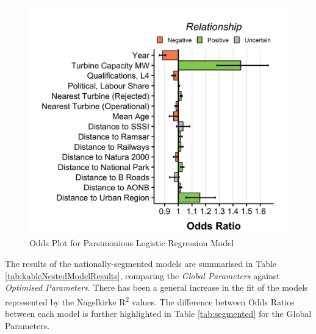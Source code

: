 \documentclass[a4paper,]{article}
\theoremstyle{definition}
\theoremstyle{definition}
\theoremstyle{definition}
\theoremstyle{remark}
\begin{document}
\begin{figure}[h]

{\centering \includegraphics[width=0.5\linewidth]{figures/figure7} 

}

\caption{Odds Plot for Parsimonious Logistic Regression Model}\label{fig:oddsPars}
\end{figure}

The results of the nationally-segmented models are summarised in Table
\ref{tab:kableNestedModelResults}, comparing the \emph{Global
Parameters} against \emph{Optimised Parameters}. There has been a
general increase in the fit of the models represented by the Nagelkirke
R\textsuperscript{2} values. The difference between Odds Ratios between
each model is further highlighted in Table \ref{tab:segmented} for the
Global Parameters.

\begin{table}[!h]

\caption{\label{tab:kableNestedModelResults}Comparison of subset Logistic Regression Models based on the global parameters list}
\centering
{}
\end{table}
\end{document}
